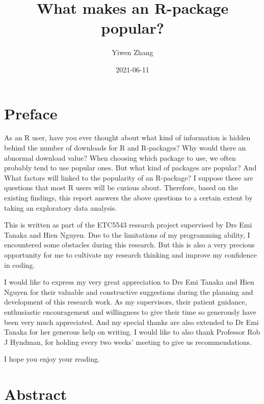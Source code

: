 \documentclass[
]{book}
\title{What makes an R-package popular?}
\author{Yiwen Zhang}
\date{2021-06-11}
\begin{document}
\maketitle

{
\setcounter{tocdepth}{1}
\tableofcontents
}
\hypertarget{preface}{%
\chapter*{Preface}\label{preface}}

As an R user, have you ever thought about what kind of information is hidden behind the number of downloads for R and R-packages? Why would there an abnormal download value? When choosing which package to use, we often probably tend to use popular ones. But what kind of packages are popular? And What factors will linked to the popularity of an R-package? I suppose these are questions that most R users will be curious about. Therefore, based on the existing findings, this report answers the above questions to a certain extent by taking an exploratory data analysis.

This is written as part of the ETC5543 research project supervised by Drs Emi Tanaka and Hien Nguyen. Due to the limitations of my programming ability, I encountered some obstacles during this research. But this is also a very precious opportunity for me to cultivate my research thinking and improve my confidence in coding.

I would like to express my very great appreciation to Drs Emi Tanaka and Hien Nguyen for their valuable and constructive suggestions during the planning and development of this research work. As my supervisors, their patient guidance, enthusiastic encouragement and willingness to give their time so generously have been very much appreciated. And my special thanks are also extended to Dr Emi Tanaka for her generous help on writing. I would like to also thank Professor Rob J Hyndman, for holding every two weeks' meeting to give us recommendations.

I hope you enjoy your reading.

\hypertarget{abstract}{%
\chapter{Abstract}\label{abstract}}
\end{document}
